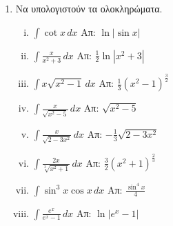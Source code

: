 \begin{enumerate}
  \item Να υπολογιστούν τα ολοκληρώματα.
    \begin{enumerate}[i)]
      \item $\int \cot x \, dx$ \hfill Απ: $\ln|\sin x|$ 
      \item $\int\frac{x}{x^2+3} \, dx$ \hfill Απ: $\frac{1}{2}\ln|x^2+3|$
      \item $ \int x \sqrt{x^{2}-1} \,{dx} $ 
        \hfill Απ: $ \frac{1}{3} (x^{2}-1)^{\frac{3}{2}} $  
      \item $\int\frac{x}{\sqrt{x^{2}-5}} \, dx$ \hfill Απ: $ \sqrt{x^{2}-5} $
      \item $\int\frac{x}{\sqrt{2-3x^{2}}} \, dx$ \hfill Απ: $ - \frac{1}{3}
      \sqrt{2-3x^{2}} $
      \item $ \int \frac{2x}{\sqrt[3]{x^{2}+1}} \,{dx} $ 
        \hfill Απ: $ \frac{3}{2} (x^{2}+1)^{\frac{2}{3}} $ 
      \item $\int \sin^3x\cos x \, dx$ \hfill Απ: $\frac{\sin^{4}x}{4}$
      \item $\int \frac{e^x}{e^x-1} \, dx$ \hfill Απ: $\ln|e^x-1|$
    \end{enumerate}
\end{enumerate}





